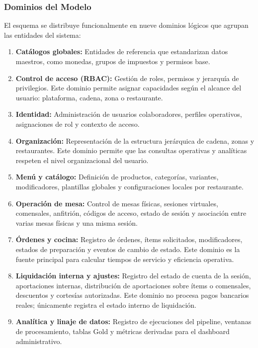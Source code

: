 \subsubsection{Dominios del Modelo}

El esquema se distribuye funcionalmente en nueve dominios lógicos que agrupan las entidades
del sistema:

\begin{enumerate}
  \item \textbf{Catálogos globales:} Entidades de referencia que estandarizan datos maestros,
  como monedas, grupos de impuestos y permisos base.

  \item \textbf{Control de acceso (RBAC):} Gestión de roles, permisos y jerarquía de
  privilegios. Este dominio permite asignar capacidades según el alcance del usuario:
  plataforma, cadena, zona o restaurante.

  \item \textbf{Identidad:} Administración de usuarios colaboradores, perfiles operativos,
  asignaciones de rol y contexto de acceso.

  \item \textbf{Organización:} Representación de la estructura jerárquica de cadena,
  zonas y restaurantes. Este dominio permite que las consultas operativas y analíticas
  respeten el nivel organizacional del usuario.

  \item \textbf{Menú y catálogo:} Definición de productos, categorías, variantes,
  modificadores, plantillas globales y configuraciones locales por restaurante.

  \item \textbf{Operación de mesa:} Control de mesas físicas, sesiones virtuales,
  comensales, anfitrión, códigos de acceso, estado de sesión y asociación entre varias
  mesas físicas y una misma sesión.

  \item \textbf{Órdenes y cocina:} Registro de órdenes, ítems solicitados, modificadores,
  estados de preparación y eventos de cambio de estado. Este dominio es la fuente principal
  para calcular tiempos de servicio y eficiencia operativa.

  \item \textbf{Liquidación interna y ajustes:} Registro del estado de cuenta de la sesión,
  aportaciones internas, distribución de aportaciones sobre ítems o comensales, descuentos
  y cortesías autorizadas. Este dominio no procesa pagos bancarios reales; únicamente
  registra el estado interno de liquidación.

  \item \textbf{Analítica y linaje de datos:} Registro de ejecuciones del pipeline,
  ventanas de procesamiento, tablas Gold y métricas derivadas para el dashboard
  administrativo.
\end{enumerate}

